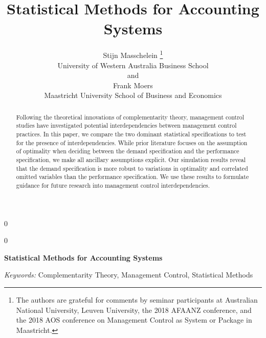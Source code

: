 \documentclass[12pt]{article}
\newcommand{\blind}{0}
\begin{document}
\def\spacingset#1{\renewcommand{\baselinestretch}%
{#1}\small\normalsize} \spacingset{1}


\blind
{
  \title{\bf Statistical Methods for Accounting Systems}

  \author{
        Stijn Masschelein \thanks{The authors are grateful for comments by seminar participants at Australian National University, Leuven University, the 2018 AFAANZ conference, and the 2018 AOS conference on Management Control as System or Package in Maastricht.} \\
    University of Western Australia Business School\\
     and \\     Frank Moers \\
    Maastricht University School of Business and Economics\\
      }
  \maketitle
} \fi

\blind
{
  \bigskip
  \bigskip
  \bigskip
  \begin{center}
    {\LARGE\bf Statistical Methods for Accounting Systems}
  \end{center}
  \medskip
} \fi

\bigskip
\begin{abstract}
Following the theoretical innovations of complementarity theory, management control studies have investigated potential interdependencies between management control practices. In this paper, we compare the two dominant statistical specifications to test for the presence of interdependencies. While prior literature focuses on the assumption of optimality when deciding between the demand specification and the performance specification, we make all ancillary assumptions explicit. Our simulation results reveal that the demand specification is more robust to variations in optimality and correlated omitted variables than the performance specification. We use these results to formulate guidance for future research into management control interdependencies.
\end{abstract}

\noindent%
{\it Keywords:} Complementarity Theory, Management Control, Statistical Methods
\vfill

\newpage
\end{document}
